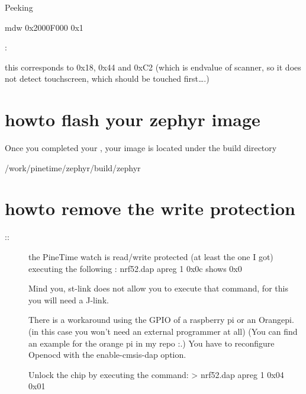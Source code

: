 \documentclass[letterpaper,10pt,english]{sphinxmanual}
\begin{document}
Peeking

\begin{sphinxVerbatim}[commandchars=\\\{\}]
\PYG{g+go}{Escape character is \PYGZsq{}\PYGZca{}]\PYGZsq{}.}
mdw 0x2000F000 0x1
\end{sphinxVerbatim}

:

this corresponds to 0x18, 0x44 and 0xC2 (which is endvalue of scanner, so it does not detect touchscreen, which should be touched first….)


\chapter{howto flash your zephyr image}
\label{\detokenize{hacking/writeprotection:howto-flash-your-zephyr-image}}\label{\detokenize{hacking/writeprotection:flashing}}\label{\detokenize{hacking/writeprotection::doc}}
Once you completed your  , your image is located under the build directory

\begin{sphinxVerbatim}[commandchars=\\\{\}]
  \PYGZti{}/work/pinetime/zephyr/build/zephyr






\end{sphinxVerbatim}


\chapter{howto remove the write protection}
\label{\detokenize{hacking/writeprotection:howto-remove-the-write-protection}}\begin{description}
\item[{::}] \leavevmode
the PineTime watch is read/write protected (at least the one I got)
executing the following : nrf52.dap apreg 1 0x0c shows 0x0

Mind you, st-link does not allow you to execute that command, for this you will need a J-link.

There is a workaround using the GPIO of a raspberry pi or an Orangepi. (in this case you won’t need an external programmer at all)
(You can find an example for the orange pi in my repo :.)
You have to reconfigure Openocd with the \textendash{}enable-cmsis-dap option.

Unlock the chip by executing the command:
\textgreater{} nrf52.dap apreg 1 0x04 0x01

\end{description}
\end{document}

